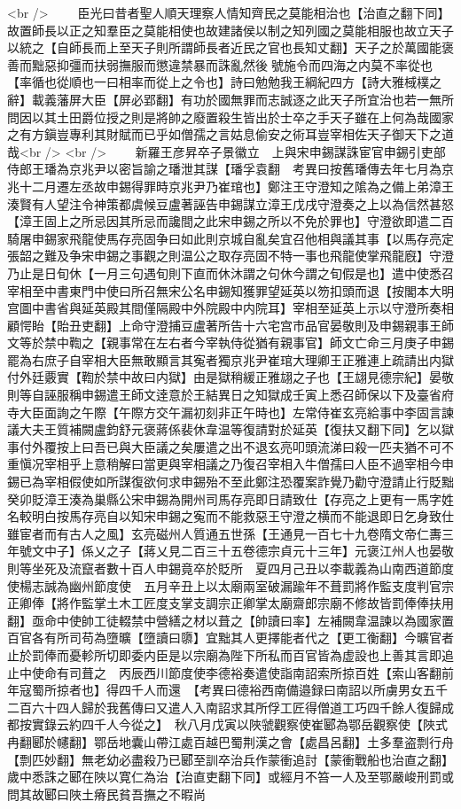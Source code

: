 <br />
　　臣光曰昔者聖人順天理察人情知齊民之莫能相治也【治直之翻下同】故置師長以正之知羣臣之莫能相使也故建諸侯以制之知列國之莫能相服也故立天子以統之【自師長而上至天子則所謂師長者近民之官也長知丈翻】天子之於萬國能褒善而黜惡抑彊而扶弱撫服而懲違禁暴而誅亂然後號施令而四海之内莫不率從也【率循也從順也一曰相率而從上之令也】詩曰勉勉我王綱紀四方【詩大雅棫樸之辭】載義藩屏大臣【屏必郢翻】有功於國無罪而志誠逐之此天子所宜治也若一無所問因以其土田爵位授之則是將帥之廢置殺生皆出於士卒之手天子雖在上何為哉國家之有方鎭豈專利其財賦而已乎如僧孺之言姑息偷安之術耳豈宰相佐天子御天下之道哉<br />
<br />
　　新羅王彦昇卒子景徽立　上與宋申錫謀誅宦官申錫引吏部侍郎王璠為京兆尹以密旨諭之璠泄其謀【璠孚袁翻　考異曰按舊璠傳去年七月為京兆十二月遷左丞故申錫得罪時京兆尹乃崔琯也】鄭注王守澄知之隂為之備上弟漳王湊賢有人望注令神策都虞候豆盧著誣告申錫謀立漳王戊戌守澄奏之上以為信然甚怒【漳王固上之所忌因其所忌而讒間之此宋申錫之所以不免於罪也】守澄欲即遣二百騎屠申錫家飛龍使馬存亮固争曰如此則京城自亂矣宜召他相與議其事【以馬存亮定張韶之難及争宋申錫之事觀之則温公之取存亮固不特一事也飛龍使掌飛龍廐】守澄乃止是日旬休【一月三句遇旬則下直而休沐謂之句休今謂之旬假是也】遣中使悉召宰相至中書東門中使曰所召無宋公名申錫知獲罪望延英以笏扣頭而退【按閣本大明宫圖中書省與延英殿其間僅隔殿中外院殿中内院耳】宰相至延英上示以守澄所奏相顧愕眙【貽丑吏翻】上命守澄捕豆盧著所告十六宅宫市品官晏敬則及申錫親事王師文等於禁中鞫之【親事常在左右者今宰執侍從猶有親事官】師文亡命三月庚子申錫罷為右庶子自宰相大臣無敢顯言其寃者獨京兆尹崔琯大理卿王正雅連上疏請出内獄付外廷覈實【鞫於禁中故曰内獄】由是獄稍緩正雅翃之子也【王翃見德宗紀】晏敬則等自誣服稱申錫遣王師文逹意於王結異日之知獄成壬寅上悉召師保以下及臺省府寺大臣面詢之午際【午際方交午漏初刻非正午時也】左常侍崔玄亮給事中李固言諫議大夫王質補闕盧鈞舒元褒蔣係裴休韋温等復請對於延英【復扶又翻下同】乞以獄事付外覆按上曰吾已與大臣議之矣屢遣之出不退玄亮叩頭流涕曰殺一匹夫猶不可不重愼况宰相乎上意稍解曰當更與宰相議之乃復召宰相入牛僧孺曰人臣不過宰相今申錫已為宰相假使如所謀復欲何求申錫殆不至此鄭注恐覆案詐覺乃勸守澄請止行貶黜癸卯貶漳王湊為巢縣公宋申錫為開州司馬存亮即日請致仕【存亮之上更有一馬字姓名較明白按馬存亮自以知宋申錫之寃而不能救惡王守澄之横而不能退即日乞身致仕雖宦者而有古人之風】玄亮磁州人質通五世孫【王通見一百七十九卷隋文帝仁夀三年號文中子】係乂之子【蔣乂見二百三十五卷德宗貞元十三年】元褒江州人也晏敬則等坐死及流竄者數十百人申錫竟卒於貶所　夏四月己丑以李載義為山南西道節度使楊志誠為幽州節度使　五月辛丑上以太廟兩室破漏踰年不葺罰將作監支度判官宗正卿俸【將作監掌土木工匠度支掌支調宗正卿掌太廟齋郎宗廟不修故皆罰俸俸扶用翻】亟命中使帥工徒輟禁中營繕之材以葺之【帥讀曰率】左補闕韋温諫以為國家置百官各有所司苟為墮曠【墮讀曰隳】宜黜其人更擇能者代之【更工衡翻】今曠官者止於罰俸而憂軫所切即委内臣是以宗廟為陛下所私而百官皆為虚設也上善其言即追止中使命有司葺之　丙辰西川節度使李德裕奏遣使詣南詔索所掠百姓【索山客翻前年寇蜀所掠者也】得四千人而還　【考異曰德裕西南備邉録曰南詔以所虜男女五千二百六十四人歸於我舊傳曰又遣人入南詔求其所俘工匠得僧道工巧四千餘人復歸成都按實錄云約四千人今從之】　秋八月戊寅以陜虢觀察使崔郾為鄂岳觀察使【陜式冉翻郾於幰翻】鄂岳地囊山帶江處百越巴蜀荆漢之會【處昌呂翻】土多羣盗剽行舟【剽匹妙翻】無老幼必盡殺乃已郾至訓卒治兵作蒙衝追討【蒙衝戰船也治直之翻】歲中悉誅之郾在陜以寛仁為治【治直吏翻下同】或經月不笞一人及至鄂嚴峻刑罰或問其故郾曰陜土瘠民貧吾撫之不暇尚